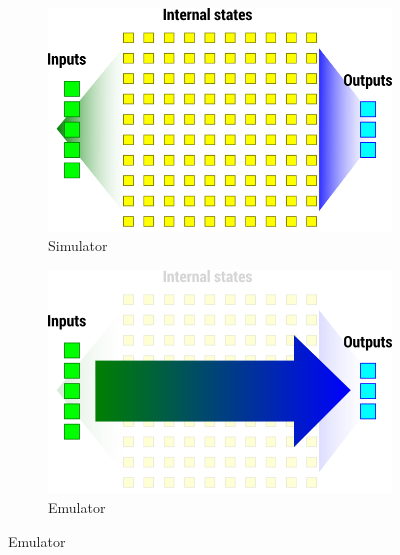 \documentclass[xcolor=dvipsnames, USenglish]{beamer}  %
\begin{document}
\begin{frame}
    \begin{figure}
      \centering
      \begin{subfigure}[b]{0.4\textwidth}
          \includegraphics[width=\textwidth]{img/simulator.png}
          \caption{Simulator}
          \label{subfig:simulator}
      \end{subfigure}
      \quad
      \begin{subfigure}[b]{0.4\textwidth}
        \includegraphics[width=\textwidth]{img/emulator.png}
        \caption{Emulator}
        \label{subfig:emulator}
      \end{subfigure}
    \end{figure}
  \end{frame}

\end{document}
